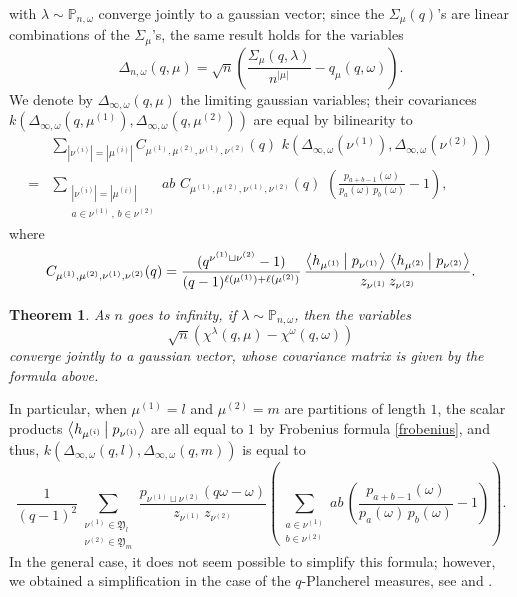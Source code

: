 \documentclass[smallextended,nospthms]{svjour3}
\newtheorem{theorem}{Theorem}
\theoremstyle{remark}
\newcommand{\ym}{\mathfrak{Y}}
\newcommand{\proba}{\mathbb{P}}
\newcommand{\scal}[2]{\left\langle #1\vphantom{#2}\,\right |\left.#2 \vphantom{#1}\right\rangle}
\begin{document}
with $\lambda \sim \proba_{n,\omega}$ converge jointly to a gaussian vector; since the $\varSigma_{\mu}(q)$'s are linear combinations of the $\varSigma_{\mu}$'s, the same result holds for the variables 
 $$\Delta_{n,\omega}(q,\mu)=\sqrt{n}\left(\frac{\varSigma_{\mu}(q,\lambda)}{n^{|\mu|}}-q_{\mu}(q,\omega)\right).$$ 
We denote by $\Delta_{\infty,\omega}(q,\mu)$ the limiting gaussian variables; their covariances $k(\Delta_{\infty,\omega}(q,\mu^{(1)}),\Delta_{\infty,\omega}(q,\mu^{(2)}))$ are equal by bilinearity to
 \begin{align*}
&\sum_{|\nu^{(i)}|=|\mu^{(i)}|} C_{\mu^{(1)},\mu^{(2)},\nu^{(1)},\nu^{(2)}}(q)\, \,k(\Delta_{\infty,\omega}(\nu^{(1)}),\Delta_{\infty,\omega}(\nu^{(2)}))\\
=& \sum_{\substack{|\nu^{(i)}|=|\mu^{(i)}| \\ a \in \nu^{(1)}\,,\, b \in \nu^{(2)}}} ab\,\, C_{\mu^{(1)},\mu^{(2)},\nu^{(1)},\nu^{(2)}}(q) \,\,\left(\frac{p_{a+b-1}(\omega)}{p_{a}(\omega)\,p_{b}(\omega)}-1\right),
 \end{align*}
where  $$C_{\mu^{(1)},\mu^{(2)},\nu^{(1)},\nu^{(2)}}(q) =\frac{(q^{\nu^{(1)}\sqcup\nu^{(2)}}-1)}{(q-1)^{\ell(\mu^{(1)})+\ell(\mu^{(2)})}}\,\frac{\scal{h_{\mu^{(1)}}}{p_{\nu^{(1)}}}\,\scal{h_{\mu^{(2)}}}{p_{\nu^{(2)}}} }{z_{\nu^{(1)}}\,z_{\nu^{(2)}} }.$$
\begin{theorem}
As $n$ goes to infinity, if $\lambda \sim \proba_{n,\omega}$, then the variables $$\sqrt{n}\left(\chi^{\lambda}(q,\mu)-\chi^{\omega}(q,\omega)\right)$$ converge jointly to a gaussian vector, whose covariance matrix is given by the formula above.
\end{theorem}
\noindent In particular, when $\mu^{(1)}=l$ and $\mu^{(2)}=m$ are partitions of length $1$, the scalar products $\scal{h_{\mu^{(i)}}}{p_{\nu^{(i)}}}$ are all equal to $1$ by Frobenius formula \ref{frobenius}, and thus, $k(\Delta_{\infty,\omega}(q,l),\Delta_{\infty,\omega}(q,m))$ is equal to
$$\frac{1}{(q-1)^{2}}\sum_{\substack{\nu^{(1)} \in \ym_{l} \\ \nu^{(2)} \in \ym_{m} }}  \frac{p_{\nu^{(1)}\sqcup \nu^{(2)}}(q\omega - \omega)}{z_{\nu^{(1)}} \,z_{\nu^{(2)}}}\left(\sum_{\substack{ a \in \nu^{(1)}\\ b \in \nu^{(2)}}} ab\,\left(\frac{p_{a+b-1}(\omega)}{p_{a}(\omega)\,p_{b}(\omega)}-1\right)\right).$$
In the general case, it does not seem possible to simplify this formula; however, we obtained a simplification in the case of the $q$-Plancherel measures, see \cite{FM10} and \cite{Mel10}.
\end{document}
